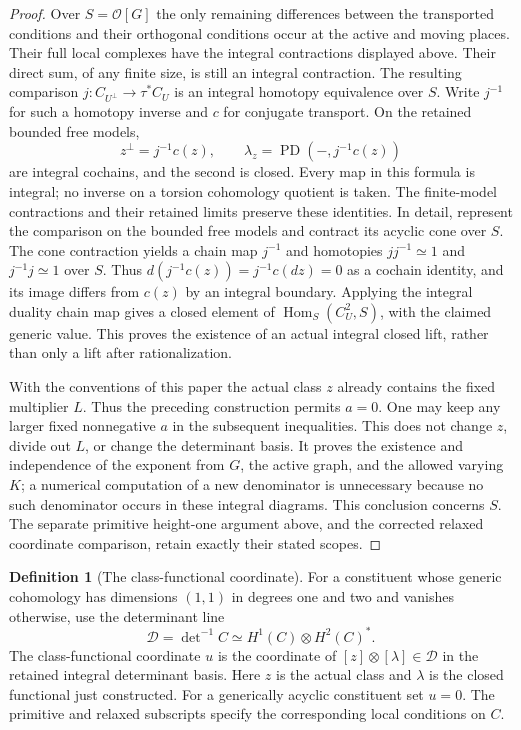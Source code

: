 \documentclass[11pt]{article}
\theoremstyle{definition}
\newtheorem{definition}[theorem]{Definition}
\theoremstyle{remark}
\providecommand{\mathscr}[1]{\mathcal{#1}}
\begin{document}
\begin{proof}
Over $S=\mathscr O[G]$ the only remaining differences between the
transported conditions and their orthogonal conditions occur at the
active and moving places.  Their full local complexes have the
integral contractions displayed above.  Their direct sum, of any
finite size, is still an integral contraction.  The resulting
comparison $j:C_{U^\perp}\to\tau^*C_U$ is an integral homotopy
equivalence over $S$.  Write $j^{-1}$ for such a homotopy inverse and
$c$ for conjugate transport.  On the retained bounded free models,
\[
 z^\perp=j^{-1}c(z),\qquad
 \lambda_z=\operatorname{PD}(-,j^{-1}c(z))
\]
are integral cochains, and the second is closed.  Every map in this
formula is integral; no inverse on a torsion cohomology quotient is
taken.  The finite-model contractions and their retained limits
preserve these identities.
In detail, represent the comparison on the bounded free models and
contract its acyclic cone over $S$.  The cone contraction yields a
chain map $j^{-1}$ and homotopies $jj^{-1}\simeq1$ and
$j^{-1}j\simeq1$ over $S$.  Thus
$d(j^{-1}c(z))=j^{-1}c(dz)=0$ as a cochain identity, and its image
differs from $c(z)$ by an integral boundary.  Applying the integral
duality chain map gives a closed element of
$\operatorname{Hom}_S(C_U^2,S)$, with the claimed generic value.
This proves the existence of an actual integral closed lift, rather
than only a lift after rationalization.

With the conventions of this paper the actual class $z$ already
contains the fixed multiplier $L$.  Thus the preceding construction
permits $a=0$.  One may keep any larger fixed nonnegative $a$ in the
subsequent inequalities.  This does not change $z$, divide out $L$,
or change the determinant basis.  It proves the existence and
independence of the exponent from $G$, the active graph, and the
allowed varying $K$; a numerical computation of a new denominator
is unnecessary because no such denominator occurs in these integral
diagrams.  This conclusion concerns $S$.  The separate primitive
height-one argument above, and the corrected relaxed coordinate
comparison, retain exactly their stated scopes.
\end{proof}

\begin{definition}[The class-functional coordinate]
\label{ex:arith-coordinate}
For a constituent whose generic cohomology has dimensions $(1,1)$
in degrees one and two and vanishes otherwise, use the determinant
line
\[
 \mathcal D=\det\nolimits^{-1} C
       \simeq H^1(C)\otimes H^2(C)^*.
\]
The class-functional coordinate $u$ is the coordinate of
$[z]\otimes[\lambda]\in\mathcal D$ in the retained integral
determinant basis. Here $z$ is the actual class and $\lambda$ is
the closed functional just constructed. For a generically acyclic
constituent set $u=0$. The primitive and relaxed subscripts
specify the corresponding local conditions on $C$.
\end{definition}
\end{document}
